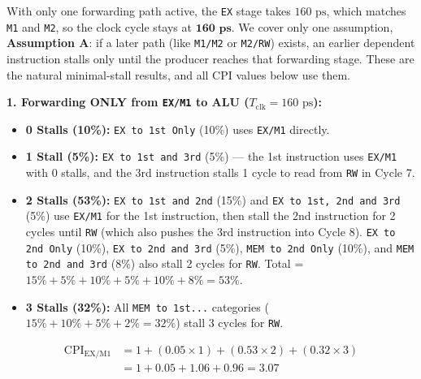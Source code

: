 \documentclass[11pt, a4paper]{article}
\begin{document}
With only one forwarding path active, the \texttt{EX} stage takes $160\text{ ps}$, which matches \texttt{M1} and \texttt{M2}, so the clock cycle stays at $\mathbf{160\text{ ps}}$. We cover only one assumption, \textbf{Assumption A}: if a later path (like \texttt{M1/M2} or \texttt{M2/RW}) exists, an earlier dependent instruction stalls only until the producer reaches that forwarding stage. These are the natural minimal-stall results, and all CPI values below use them.

\textbf{1. Forwarding ONLY from \texttt{EX/M1} to ALU ($T_{\text{clk}} = 160\text{ ps}$):}
\begin{itemize}[noitemsep, topsep=2pt]
    \item \textbf{0 Stalls (10\%):} \texttt{EX to 1st Only} (10\%) uses \texttt{EX/M1} directly.
    \item \textbf{1 Stall (5\%):} \texttt{EX to 1st and 3rd} (5\%) --- the 1st instruction uses \texttt{EX/M1} with 0 stalls, and the 3rd instruction stalls 1 cycle to read from \texttt{RW} in Cycle 7.
    \item \textbf{2 Stalls (53\%):} \texttt{EX to 1st and 2nd} (15\%) and \texttt{EX to 1st, 2nd and 3rd} (5\%) use \texttt{EX/M1} for the 1st instruction, then stall the 2nd instruction for 2 cycles until \texttt{RW} (which also pushes the 3rd instruction into Cycle 8). \texttt{EX to 2nd Only} (10\%), \texttt{EX to 2nd and 3rd} (5\%), \texttt{MEM to 2nd Only} (10\%), and \texttt{MEM to 2nd and 3rd} (8\%) also stall 2 cycles for \texttt{RW}. Total = $15\% + 5\% + 10\% + 5\% + 10\% + 8\% = 53\%$.
    \item \textbf{3 Stalls (32\%):} All \texttt{MEM to 1st...} categories ($15\% + 10\% + 5\% + 2\% = 32\%$) stall 3 cycles for \texttt{RW}.
\end{itemize}
\begin{align*}
    \text{CPI}_{\text{EX/M1}} &= 1 + (0.05 \times 1) + (0.53 \times 2) + (0.32 \times 3) \\
    &= 1 + 0.05 + 1.06 + 0.96 = \mathbf{3.07}
\end{align*}
\end{document}

